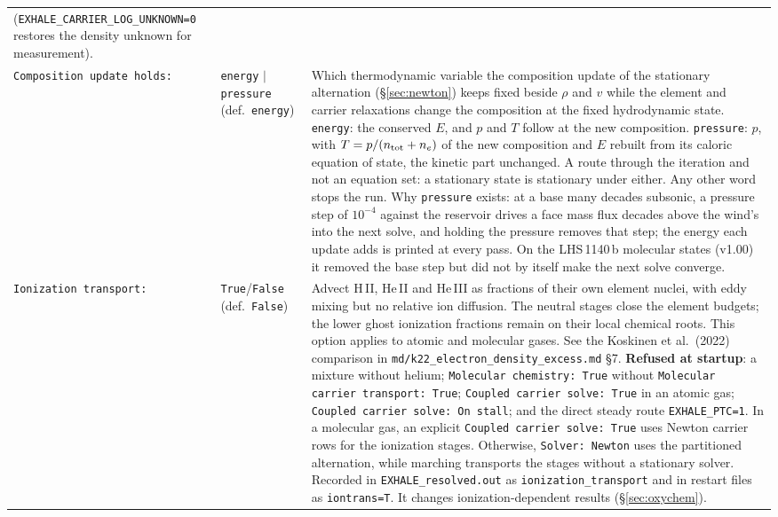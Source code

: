 \documentclass[english,a4paper]{my_memo}
\begin{document}
\begin{longtable}{@{}p{}p{}p{}@{}}
  (\texttt{EXHALE\_CARRIER\_LOG\_UNKNOWN=0} restores the density unknown for
  measurement). \\
\texttt{Composition update holds:} & \texttt{energy} $|$ \texttt{pressure}
  (def.\ \texttt{energy}) & Which thermodynamic variable the composition
  update of the stationary alternation (\S\ref{sec:newton}) keeps fixed beside
  $\rho$ and $v$ while the element and carrier relaxations change the
  composition at the fixed hydrodynamic state. \texttt{energy}: the conserved
  $E$, and $p$ and $T$ follow at the new composition. \texttt{pressure}: $p$,
  with $T=p/(n_{\rm tot}+n_e)$ of the new composition and $E$ rebuilt from its
  caloric equation of state, the kinetic part unchanged. A route through the
  iteration and not an equation set: a stationary state is stationary under
  either. Any other word stops the run. Why \texttt{pressure} exists: at a
  base many decades subsonic, a pressure step of $10^{-4}$ against the
  reservoir drives a face mass flux decades above the wind's into the next
  solve, and holding the pressure removes that step; the energy each update
  adds is printed at every pass. On the LHS\,1140\,b molecular states
  (v1.00) it removed the base step but did not by itself make the next solve
  converge. \\
\texttt{Ionization transport:} & \texttt{True}/\texttt{False}
  (def.\ \texttt{False}) & Advect H\,II, He\,II and He\,III as fractions of
  their own element nuclei, with eddy mixing but no relative ion diffusion.
  The neutral stages close the element budgets; the lower ghost ionization
  fractions remain on their local chemical roots. This option applies to
  atomic and molecular gases. See the Koskinen et al.\ (2022) comparison in
  \texttt{md/k22\_electron\_density\_excess.md} \S7.
  \textbf{Refused at startup}: a mixture without helium;
  \texttt{Molecular chemistry: True} without \texttt{Molecular carrier
  transport: True}; \texttt{Coupled carrier solve: True} in an atomic gas;
  \texttt{Coupled carrier solve: On stall}; and the direct steady route
  \texttt{EXHALE\_PTC=1}. In a molecular gas, an explicit
  \texttt{Coupled carrier solve: True} uses Newton carrier rows for the
  ionization stages. Otherwise, \texttt{Solver: Newton} uses the partitioned
  alternation, while marching transports the stages without a stationary
  solver. Recorded in \texttt{EXHALE\_resolved.out} as
  \texttt{ionization\_transport} and in restart files as
  \texttt{iontrans=T}. It changes ionization-dependent results
  (\S\ref{sec:oxychem}). \\

\end{longtable}
\end{document}
